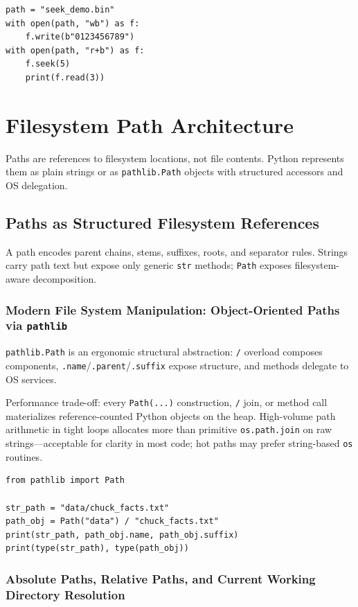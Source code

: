 \documentclass[a4paper,twoside]{report}
\begin{document}
\begin{verbatim}
path = "seek_demo.bin"
with open(path, "wb") as f:
    f.write(b"0123456789")
with open(path, "r+b") as f:
    f.seek(5)
    print(f.read(3))
\end{verbatim}


\section{Filesystem Path Architecture}

Paths are references to filesystem locations, not file contents. Python represents them as plain strings or as \texttt{pathlib.Path} objects with structured accessors and OS delegation.


\subsection{Paths as Structured Filesystem References}

A path encodes parent chains, stems, suffixes, roots, and separator rules. Strings carry path text but expose only generic \texttt{str} methods; \texttt{Path} exposes filesystem-aware decomposition.

\subsubsection{Modern File System Manipulation: Object-Oriented Paths via \texttt{pathlib}}

\texttt{pathlib.Path} is an ergonomic structural abstraction: \texttt{/} overload composes components, \texttt{.name}/\texttt{.parent}/\texttt{.suffix} expose structure, and methods delegate to OS services.

Performance trade-off: every \texttt{Path(...)} construction, \texttt{/} join, or method call materializes reference-counted Python objects on the heap. High-volume path arithmetic in tight loops allocates more than primitive \texttt{os.path.join} on raw strings---acceptable for clarity in most code; hot paths may prefer string-based \texttt{os} routines.

\begin{verbatim}
from pathlib import Path

str_path = "data/chuck_facts.txt"
path_obj = Path("data") / "chuck_facts.txt"
print(str_path, path_obj.name, path_obj.suffix)
print(type(str_path), type(path_obj))
\end{verbatim}

\subsubsection{Absolute Paths, Relative Paths, and Current Working Directory Resolution}
\end{document}
